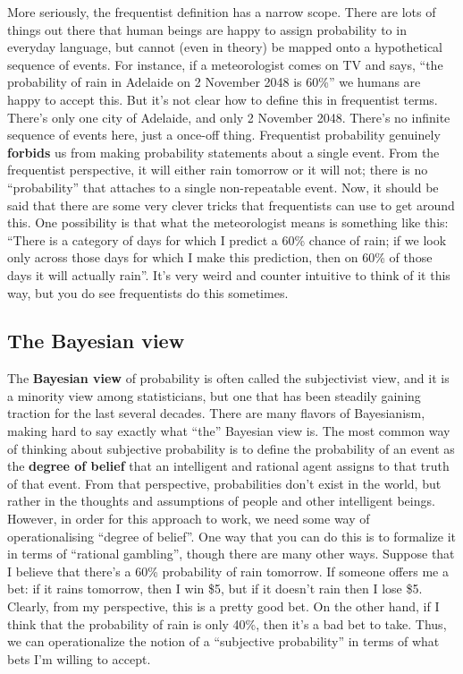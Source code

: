 \documentclass[
  letterpaper,
  DIV=11,
  numbers=noendperiod]{scrreprt}
\begin{document}
More seriously, the frequentist definition has a narrow scope. There are
lots of things out there that human beings are happy to assign
probability to in everyday language, but cannot (even in theory) be
mapped onto a hypothetical sequence of events. For instance, if a
meteorologist comes on TV and says, ``the probability of rain in
Adelaide on 2 November 2048 is 60\%'' we humans are happy to accept
this. But it's not clear how to define this in frequentist terms.
There's only one city of Adelaide, and only 2 November 2048. There's no
infinite sequence of events here, just a once-off thing. Frequentist
probability genuinely \textbf{forbids} us from making probability
statements about a single event. From the frequentist perspective, it
will either rain tomorrow or it will not; there is no ``probability''
that attaches to a single non-repeatable event. Now, it should be said
that there are some very clever tricks that frequentists can use to get
around this. One possibility is that what the meteorologist means is
something like this: ``There is a category of days for which I predict a
60\% chance of rain; if we look only across those days for which I make
this prediction, then on 60\% of those days it will actually rain''.
It's very weird and counter intuitive to think of it this way, but you
do see frequentists do this sometimes.

\subsection{The Bayesian view}\label{the-bayesian-view}

The \textbf{Bayesian view} of probability is often called the
subjectivist view, and it is a minority view among statisticians, but
one that has been steadily gaining traction for the last several
decades. There are many flavors of Bayesianism, making hard to say
exactly what ``the'' Bayesian view is. The most common way of thinking
about subjective probability is to define the probability of an event as
the \textbf{degree of belief} that an intelligent and rational agent
assigns to that truth of that event. From that perspective,
probabilities don't exist in the world, but rather in the thoughts and
assumptions of people and other intelligent beings. However, in order
for this approach to work, we need some way of operationalising ``degree
of belief''. One way that you can do this is to formalize it in terms of
``rational gambling'', though there are many other ways. Suppose that I
believe that there's a 60\% probability of rain tomorrow. If someone
offers me a bet: if it rains tomorrow, then I win \$5, but if it doesn't
rain then I lose \$5. Clearly, from my perspective, this is a pretty
good bet. On the other hand, if I think that the probability of rain is
only 40\%, then it's a bad bet to take. Thus, we can operationalize the
notion of a ``subjective probability'' in terms of what bets I'm willing
to accept.
\end{document}
